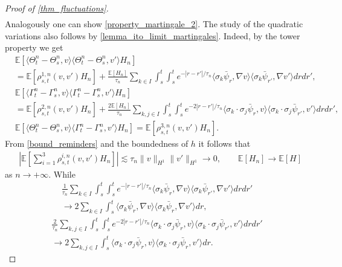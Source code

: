 \documentclass[a4paper,10pt]{amsart}
\newcommand{\expt}[1]{\mathbb{E}\left[#1\right]}
\theoremstyle{remark}
\numberwithin{equation}{section}
\begin{document}
\begin{proof}[Proof of \cref{thm_fluctuations}]
\begin{align*}
\end{align*}
Analogously one can show \eqref{property_martingale_2}.
The study of the quadratic variations also follows by \cref{lemma_ito_limit_martingales}. Indeed, by the tower property we get
\begin{align*}
  &\mathbb{E}\left[\langle \Theta^n_t-\Theta^n_s,v\rangle\langle \Theta^n_t-\Theta^n_s,v'\rangle  H_n\right]\\ &=\mathbb{E}\left[\rho_{s,t}^{1,n}(v,v')  H_n\right] +\frac{\expt{H_n}}{\tau_n}\sum_{k\in I}\int_s^t \int_s^t  e^{-|r-r'|/\tau_n} \langle \sigma_k\bar{\psi}_r,\nabla v\rangle \langle \sigma_k\bar{\psi}_{r'},\nabla v'\rangle dr dr',\\ &\mathbb{E}\left[\langle \Gamma^n_t-\Gamma^n_s,v\rangle\langle \Gamma^n_t-\Gamma^n_s,v'\rangle  H_n\right]\\ &=\mathbb{E}\left[\rho_{s,t}^{2,n}(v,v')  H_n\right] 
  +\frac{2\expt{H_n}}{\tau_n}\sum_{k,j\in I}\int_s^t \int_s^t  e^{-2|r-r'|/\tau_n} \langle \sigma_k\cdot\sigma_j\bar{\psi}_r, v\rangle \langle \sigma_k\cdot\sigma_j\bar{\psi}_{r'}, v'\rangle dr dr',\\
&\mathbb{E}\left[\langle \Theta^n_t-\Theta^n_s,v\rangle\langle \Gamma^n_t-\Gamma^n_s,v'\rangle  H_n\right]=\mathbb{E}\left[\rho_{s,t}^{3,n}(v,v')  H_n\right] .
\end{align*}
From \eqref{bound_reminders} and the boundedness of $h$ it follows that
\begin{align*}
    &\left|\mathbb{E}\left[\sum_{i=1}^3\rho_{s,t}^{i,n}(v,v')  H_n\right]\right|\lesssim \tau_n\|v\|_{H^1}\|v'\|_{H^1}\rightarrow 0,\qquad \expt{H_n}\rightarrow \expt{H}
\end{align*}
as $n\rightarrow+\infty.$ While
\begin{multline}\label{convergence_1_covar}
    \frac{1}{\tau_n}\sum_{k\in I}\int_s^t \int_s^t  e^{-|r-r'|/\tau_n} \langle \sigma_k\bar{\psi}_r,\nabla v\rangle \langle \sigma_k\bar{\psi}_{r'},\nabla v'\rangle dr dr'\\ \rightarrow 2\sum_{k\in I}\int_s^t \langle \sigma_k\bar{\psi}_r,\nabla v\rangle \langle \sigma_k\bar{\psi}_{r},\nabla v'\rangle dr,\end{multline}
    \begin{multline}\label{convergence_2_covar}
    \frac{2}{\tau_n}\sum_{k,j\in I}\int_s^t \int_s^t  e^{-2|r-r'|/\tau_n} \langle \sigma_k\cdot\sigma_j\bar{\psi}_r, v\rangle \langle \sigma_k\cdot\sigma_j\bar{\psi}_{r'}, v'\rangle dr dr'\\ \rightarrow  2\sum_{k,j\in I}\int_s^t \langle \sigma_k\cdot\sigma_j\bar{\psi}_r, v\rangle \langle \sigma_k\cdot\sigma_j\bar{\psi}_{r}, v'\rangle dr. 

\end{multline}
\end{proof}
\end{document}
